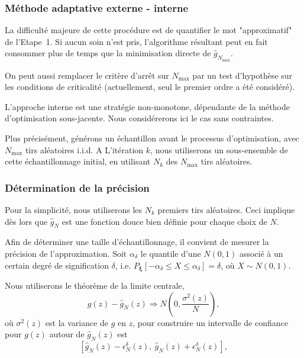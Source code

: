\documentclass[french]{beamer}
\def\bxi{\boldsymbol\xi}
\begin{document}
\begin{frame}
\frametitle{Méthode adaptative externe - interne}

La difficulté majeure de cette procédure est de quantifier le mot
"approximatif" de l'Etape~1.
Si aucun soin n'est pris, l'algorithme résultant peut en fait
consommer plus de temps que la minimisation directe de
$\hat{g}_{N_{\max}}$.

On peut aussi remplacer le critère d'arrêt sur $N_{\max}$ par un test
d'hypothèse sur les conditions de criticalité (actuellement, seul le
premier ordre a été considéré).

\mbox{}

L'{\blue approche interne} est une stratégie non-monotone, dépendante
de la méthode d'optimisation sous-jacente.
Nous considérerons ici le cas sans contraintes.

\mbox{}

Plus précisément, générons un échantillon avant le processus
d'optimisation, avec $N_{\max}$ tirs aléatoires i.i.d.
A L'itération $k$, nous utiliserons un sous-ensemble de cette
échantillonnage initial, en utilisant $N_k$ des $N_{\max}$ tirs
aléatoires.

\end{frame}

\begin{frame}
\frametitle{Détermination de la précision}

Pour la simplicité, nous utiliserons les $N_k$ premiers tirs
aléatoires.
Ceci implique dès lors que $\hat{g}_N$ est une fonction douce bien
définie pour chaque choix de $N$.

\mbox{}

Afin de déterminer une taille d'échantillonnage, il convient de
mesurer la précision de l'approximation.
Soit $\alpha_{\delta}$ le quantile d'une $N(0,1)$
associé à un certain degré de signification $\delta$, i.e.
$P_{\bxi} [ -\alpha_{\delta} \leq X \leq \alpha_{\delta} ] = \delta$,
où $X \sim N(0,1)$.

\mbox{}

Nous utiliserons le théorème de la limite centrale,
\[
g(z) - \hat{g}_N(z) \Rightarrow N \left( 0, \frac{\sigma^2(z)}{N} \right),
\]
où $\sigma^2(z)$ est la variance de $g$ en $z$, pour construire un
intervalle de confiance pour $g(z)$ autour de $\hat{g}_N(z)$ est
\[
[\hat{g}_N(z) - \epsilon^{\delta}_N(z),\ \hat{g}_N(z) + \epsilon^{\delta}_N(z)],
\]

\end{frame}
\end{document}

